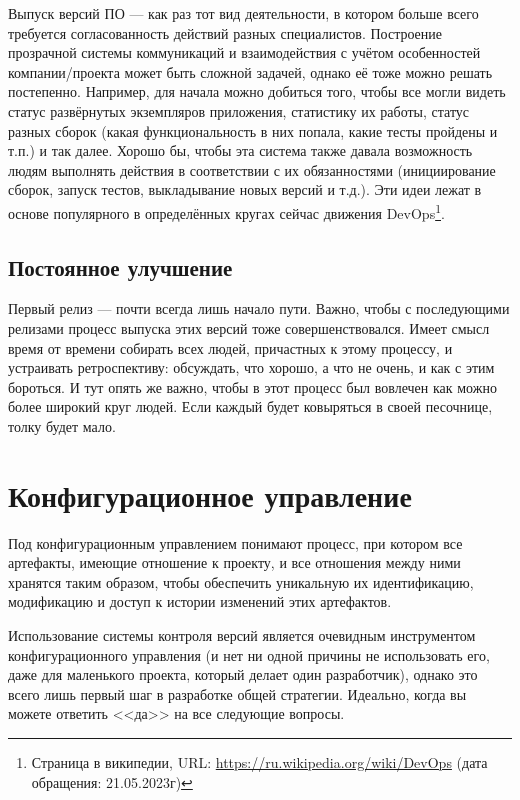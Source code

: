 \documentclass{../../text-style}
\begin{document}
Выпуск версий ПО --- как раз тот вид деятельности, в котором больше всего требуется согласованность действий разных специалистов. Построение прозрачной системы коммуникаций и взаимодействия с учётом особенностей компании/проекта может быть сложной задачей, однако её тоже можно решать постепенно. Например, для начала можно добиться того, чтобы все могли видеть статус развёрнутых экземпляров приложения, статистику их работы, статус разных сборок (какая функциональность в них попала, какие тесты пройдены и т.п.) и так далее. Хорошо бы, чтобы эта система также давала возможность людям выполнять действия в соответствии с их обязанностями (инициирование сборок, запуск тестов, выкладывание новых версий и т.д.). Эти идеи лежат в основе популярного в определённых кругах сейчас движения DevOps\footnote{Страница в википедии, URL: \url{https://ru.wikipedia.org/wiki/DevOps} (дата обращения: 21.05.2023г)}.

\subsection{Постоянное улучшение}

Первый релиз --- почти всегда лишь начало пути. Важно, чтобы с последующими релизами процесс выпуска этих версий тоже совершенствовался. Имеет смысл время от времени собирать всех людей, причастных к этому процессу, и устраивать ретроспективу: обсуждать, что хорошо, а что не очень, и как с этим бороться. И тут опять же важно, чтобы в этот процесс был вовлечен как можно более широкий круг людей. Если каждый будет ковыряться в своей песочнице, толку будет мало.

\section{Конфигурационное управление}

Под конфигурационным управлением понимают процесс, при котором все артефакты, имеющие отношение к проекту, и все отношения между ними хранятся таким образом, чтобы обеспечить уникальную их идентификацию, модификацию и доступ к истории изменений этих артефактов.

Использование системы контроля версий является очевидным инструментом конфигурационного управления (и нет ни одной причины не использовать его, даже для маленького проекта, который делает один разработчик), однако это всего лишь первый шаг в разработке общей стратегии. Идеально, когда вы можете ответить <<да>> на все следующие вопросы.
\end{document}
